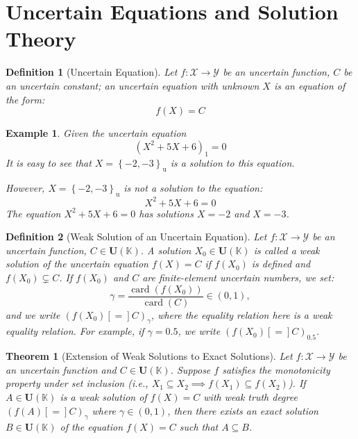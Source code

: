 \documentclass[a4paper,12pt,twoside]{memoir}
\newtheorem{definition}{Definition}[chapter]
\newtheorem{theorem}{Theorem}[chapter]
\newtheorem{example}{Example}[chapter]
\DeclareMathOperator{\card}{card}
\newcommand{\set}[1]{\left\{#1\right\}} %
\newcommand{\s}[1]{\set{#1}_\mathrm{u}} %
\newcommand{\tsbd}[1]{\mathbf{U}(\mathbb{#1})}
\newcommand{\kgdd}[1]{\left(#1\right)_1} %
\begin{document}
	\section{Uncertain Equations and Solution Theory}
	
	\begin{definition}[Uncertain Equation]
		Let $f : \mathcal{X}\to \mathcal{Y}$ be an uncertain function, $C$ be an uncertain constant; an uncertain equation with unknown $X$ is an equation of the form: \[f(X) = C\]
	\end{definition}
	
	\begin{example}
		Given the uncertain equation \[\kgdd{X^2+5X+6} = 0 \]
		It is easy to see that $X = \s{-2,-3}$ is a solution to this equation.
		
		However, $X = \s{-2,-3}$ is not a solution to the equation:
		\[X^2+5X+6 = 0 \]
		The equation $X^2+5X+6 = 0$ has solutions $X=-2$ and $X=-3$.
	\end{example}
	
	\begin{definition}[Weak Solution of an Uncertain Equation]
		Let $f : \mathcal{X} \to \mathcal{Y}$ be an uncertain function, $C \in \tsbd{K}$.
		A solution $X_0 \in \tsbd{K}$ is called a weak solution of the uncertain equation $f(X) = C$ if $f(X_0)$ is defined and $f(X_0) \subsetneq C$. If $f(X_0)$ and $C$ are finite-element uncertain numbers, we set: \[\gamma = \frac{\card(f(X_0))}{\card(C)} \in (0,1),\] and we write $(f(X_0) [=] C)_\gamma$, where the equality relation here is a weak equality relation. For example, if $\gamma = 0.5$, we write $(f(X_0) [=] C)_{0.5}$.
	\end{definition}
	
	\begin{theorem}[Extension of Weak Solutions to Exact Solutions]
		Let $f : \mathcal{X} \to \mathcal{Y}$ be an uncertain function and $C \in \tsbd{K}$. Suppose $f$ satisfies the monotonicity property under set inclusion (i.e., $X_1 \subseteq X_2 \implies f(X_1) \subseteq f(X_2)$). If $A \in \tsbd{K}$ is a weak solution of $f(X) = C$ with weak truth degree $(f(A) [=] C)_\gamma$ where $\gamma \in (0, 1)$, then there exists an exact solution $B \in \tsbd{K}$ of the equation $f(X) = C$ such that $A \subseteq B$.
	\end{theorem}
	
\end{document}
